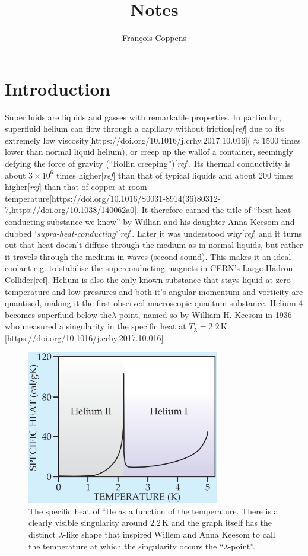 \documentclass[12pt,a4paper]{book}
\author{Fran\c{c}ois Coppens}
\title{Notes}
\newcommand{\unit}[1]{\,\mathrm{#1}}
\begin{document}
\tableofcontents
\chapter{Introduction}
	Superfluids are liquids and gasses with remarkable properties. In particular, superfluid helium can flow through a capillary without friction[\emph{ref}] due to its extremely low viscosity[https://doi.org/10.1016/j.crhy.2017.10.016]($\approx\!1500$ times lower than normal liquid helium), or creep up the wallof a container, seemingly defying the force of gravity (``Rollin creeping'')[\emph{ref}]. Its thermal conductivity is about $3\times10^6$ times higher[\emph{ref}] than that of typical liquids and about 200 times higher[\emph{ref}] than that of copper at room temperature[https://doi.org/10.1016/S0031-8914(36)80312-7,https://doi.org/10.1038/140062a0]. It therefore earned the title of ``best heat conducting substance we know'' by Willian and his daughter Anna Keesom and dubbed `\emph{supra-heat-conducting}'[\emph{ref}]. Later it was understood why[\emph{ref}] and it turns out that heat doesn't diffuse through the medium as in normal liquids, but rather it travels through the medium in waves (second sound). This makes it an ideal coolant e.g. to stabilise the superconducting magnets in CERN's Large Hadron Collider[ref]. Helium is also the only known substance that stays liquid at zero temperature and low pressures and both it's angular momentum and vorticity are quantised, making it the first observed macroscopic quantum substance. Helium-4 becomes superfluid below the$\lambda$-point, named so by William H. Keesom in 1936 who measured a singularity in the specific heat at $T_\lambda=2.2\unit{K}$.[https://doi.org/10.1016/j.crhy.2017.10.016]\\
	
	\begin{figure}[t]
		\begin{center}
			\includegraphics[width=0.75\textwidth]{specific-heat}
		\end{center}
		\caption{The specific heat of $^4$He as a function of the temperature. There is a clearly visible singularity around $2.2\unit{K}$ and the graph itself has the distinct $\lambda$-like shape that inspired Willem and Anna Keesom to call the temperature at which the singularity occurs the ``$\lambda$-point''.}
		\label{fig:specific-heat}
	\end{figure}	
	
\end{document}
